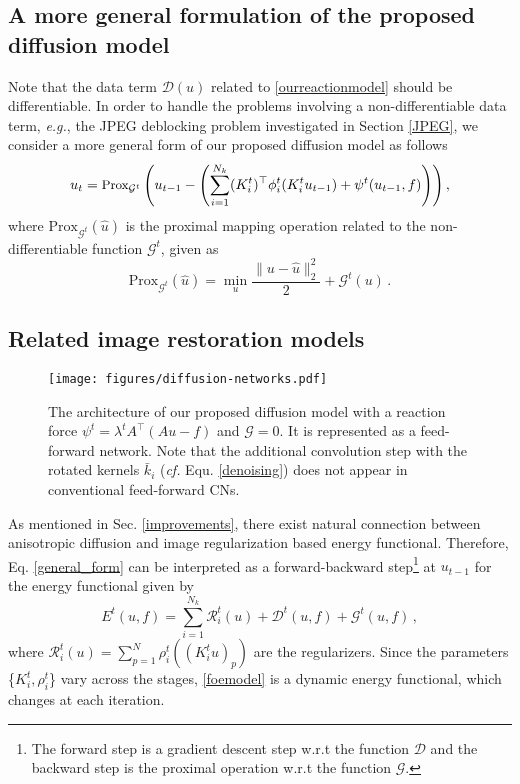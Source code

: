 \documentclass[10pt,journal,compsoc]{IEEEtran}
\newcommand{\cD}{\mathcal{D}}
\newcommand{\cG}{\mathcal{G}}
\newcommand{\suml}[2]{\sum\limits_{#1}^{#2}}
\newcommand{\eg}{\emph{e.g.}}
\begin{document}
{\subsection{A more general formulation of the proposed diffusion model}
Note that the data term $\cD(u)$ related to \eqref{ourreactionmodel} 
should be differentiable. In order to handle the problems involving a 
non-differentiable data term, \eg, the JPEG deblocking 
problem investigated in Section \ref{JPEG}, we consider a more general form 
of our proposed diffusion model as follows
\begin{equation}\label{general_form}
\small
u_{t} = \text{Prox}_{\cG^t} \left(
u_{t-1} - \left(\sum\limits_{i = 1}^{N_k}(K_i^t)^\top \phi_i^t(K_i^t u_{t-1}) 
+ \psi^t(u_{t-1}, f)\right)\right),
\end{equation}
where $\text{Prox}_{\cG^t}(\hat u)$ 
is the proximal mapping operation \cite{ipiano} related to 
the non-differentiable function $\cG^t$, given as 
\[
\text{Prox}_{ \cG^t}(\hat u) = \min\limits_{u}\frac{\|u - \hat u\|_2^2}{2} 
+  \cG^t(u) \,.
\]

\vspace*{-0.5cm}
\subsection{Related image restoration models}\label{relations}
\begin{figure*}[htb!]
\centering
\vspace{-0.5cm}
\hspace*{-0.9cm} {\texttt{[image: figures/diffusion-networks.pdf]}}
\vspace*{-1.2cm}
\caption{The architecture of our proposed diffusion model with a reaction 
force $\psi^t = \lambda^t A^\top (A u - f)$ and $\cG = 0$. 
It is represented as a feed-forward network. Note that the additional convolution step with the rotated kernels $\bar k_i$
(\textit{cf.} Equ. \ref{denoising}) does not appear in conventional feed-forward CNs. }\label{fig:feedforwardCNN}
\end{figure*}
As mentioned in Sec. \ref{improvements},  
there exist natural connection between anisotropic diffusion and 
image regularization based energy functional. Therefore, Eq. \eqref{general_form}
can be interpreted as a forward-backward step\footnote{
The forward step is a gradient descent step w.r.t the function $\cD$ 
and the backward step is the proximal operation w.r.t the function $\cG$.} 
\cite{lions1979splitting} at
$u_{t-1}$ for the energy functional given by
\begin{equation}\label{foemodel}
E^t(u, f) = \suml{i = 1}{N_k} \mathcal{R}^t_i(u) + \cD^t(u, f) + \cG^t(u, f)\,,
\end{equation}
where $\mathcal{R}^t_i(u) = \sum\nolimits_{p = 1}^{N} \rho_i^t((K_i^t
u)_p)$ are the regularizers. 
Since the parameters \{$K_i^t,
\rho_i^t$\} vary across the stages, \eqref{foemodel} is a dynamic energy
functional, which changes at each iteration.

}
\end{document}
